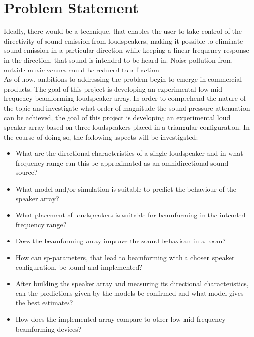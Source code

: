 \section{Problem Statement}\label{sec:problem_statement}
Ideally, there would be a technique, that enables the user to take control of the directivity of sound emission from loudspeakers, making it possible to eliminate sound emission in a particular direction while keeping a linear frequency response in the direction, that sound is intended to be heard in. Noise pollution from outside music venues could be reduced to a fraction.\\
As of now, ambitions to addressing the problem begin to emerge in commercial products.
The goal of this project is developing an experimental low-mid frequency beamforming loudspeaker array. In order to comprehend the nature of the topic and investigate what order of magnitude the sound pressure attenuation can be achieved, the goal of this project is developing an experimental loud speaker array based on three loudspeakers placed in a triangular configuration.
In the course of doing so, the following aspects will be investigated:
\begin{itemize}
\item What are the directional characteristics of a single loudspeaker and in what frequency range can this be approximated as an omnidirectional sound source?
\item What model and/or simulation is suitable to predict the behaviour of the speaker array?
\item What placement of loudspeakers is suitable for beamforming in the intended frequency range?
\item Does the beamforming array improve the sound behaviour in a room?
\item How can \gls{sp}-parameters, that lead to beamforming with a chosen speaker configuration, be found and implemented?
\item After building the speaker array and measuring its directional characteristics, can the predictions given by the models be confirmed and what model gives the best estimates?
\item How does the implemented array compare to other low-mid-frequency beamforming devices?
\end{itemize}

%



